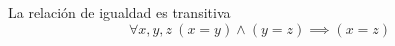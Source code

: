 \begin{theorem} \label{eq_trans} La relación de igualdad es transitiva
	\begin{equation}
		\forall x,y,z\ (x=y) \land (y=z) \implies (x=z)
	\end{equation}
\end{theorem}

